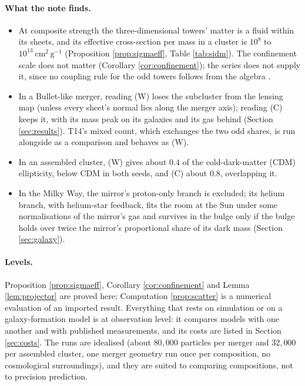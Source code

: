 \documentclass[11pt]{article}
\theoremstyle{definition}
\newcommand{\cmg}{\mathrm{cm^{2}\,g^{-1}}}
\begin{document}
\paragraph{What the note finds.}
\begin{itemize}
\item At composite strength the three-dimensional towers' matter is a fluid within its sheets, and its effective cross-section per mass in a cluster is $10^{8}$ to $10^{13}\ \cmg$ (Proposition \ref{prop:sigmaeff}, Table \ref{tab:sidm}). The confinement scale does not matter (Corollary \ref{cor:confinement}); the series does not supply it, since no coupling rule for the odd towers follows from the algebra \cite[Prop.~A.4]{ButlerT14}.
\item In a Bullet-like merger, reading (W) loses the subcluster from the lensing map (unless every sheet's normal lies along the merger axis); reading (C) keeps it, with its mass peak on its galaxies and its gas behind (Section \ref{sec:results}). T14's mixed count, which exchanges the two odd shares, is run alongside as a comparison and behaves as (W).
\item In an assembled cluster, (W) gives about $0.4$ of the cold-dark-matter (CDM) ellipticity, below CDM in both seeds, and (C) about $0.8$, overlapping it.
\item In the Milky Way, the mirror's proton-only branch is excluded; its helium branch, with helium-star feedback, fits the room at the Sun under some normalisations of the mirror's gas and survives in the bulge only if the bulge holds over twice the mirror's proportional share of its dark mass (Section \ref{sec:galaxy}).
\end{itemize}

\paragraph{Levels.} Proposition \ref{prop:sigmaeff}, Corollary \ref{cor:confinement} and Lemma \ref{lem:projector} are proved here; Computation \ref{prop:scatter} is a numerical evaluation of an imported result. Everything that rests on simulation or on a galaxy-formation model is at observation level: it compares models with one another and with published measurements, and its costs are listed in Section \ref{sec:costs}. The runs are idealised (about $80{,}000$ particles per merger and $32{,}000$ per assembled cluster, one merger geometry run once per composition, no cosmological surroundings), and they are suited to comparing compositions, not to precision prediction.
\end{document}
